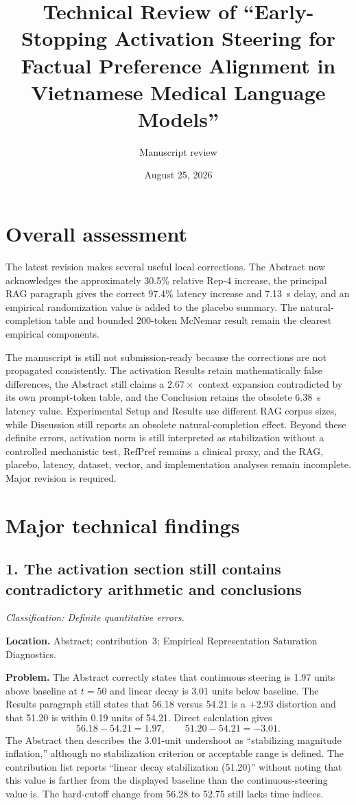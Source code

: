 \documentclass[11pt]{article}
\title{Technical Review of ``Early-Stopping Activation Steering for Factual Preference Alignment in Vietnamese Medical Language Models''}
\author{Manuscript review}
\date{August 25, 2026}
\newcommand{\findinglabel}[1]{\textbf{#1}}
\newcommand{\classification}[1]{\textit{Classification: #1.}}
\begin{document}
\maketitle

\section*{Overall assessment}

The latest revision makes several useful local corrections.  The Abstract now acknowledges the approximately 30.5\% relative Rep-4 increase, the principal RAG paragraph gives the correct 97.4\% latency increase and 7.13~s delay, and an empirical randomization value is added to the placebo summary.  The natural-completion table and bounded 200-token McNemar result remain the clearest empirical components.

The manuscript is still not submission-ready because the corrections are not propagated consistently.  The activation Results retain mathematically false differences, the Abstract still claims a $2.67\times$ context expansion contradicted by its own prompt-token table, and the Conclusion retains the obsolete 6.38~s latency value.  Experimental Setup and Results use different RAG corpus sizes, while Discussion still reports an obsolete natural-completion effect.  Beyond these definite errors, activation norm is still interpreted as stabilization without a controlled mechanistic test, RefPref remains a clinical proxy, and the RAG, placebo, latency, dataset, vector, and implementation analyses remain incomplete.  Major revision is required.

\section*{Major technical findings}

\subsection*{1. The activation section still contains contradictory arithmetic and conclusions}

\classification{Definite quantitative errors}

\findinglabel{Location.} Abstract; contribution~3; Empirical Representation Saturation Diagnostics.

\findinglabel{Problem.} The Abstract correctly states that continuous steering is 1.97 units above baseline at $t=50$ and linear decay is 3.01 units below baseline.  The Results paragraph still states that 56.18 versus 54.21 is a $+2.93$ distortion and that 51.20 is within 0.19 units of 54.21.  Direct calculation gives
\[
56.18-54.21=1.97,
\qquad
51.20-54.21=-3.01.
\]
The Abstract then describes the 3.01-unit undershoot as ``stabilizing magnitude inflation,'' although no stabilization criterion or acceptable range is defined.  The contribution list reports ``linear decay stabilization (51.20)'' without noting that this value is farther from the displayed baseline than the continuous-steering value is.  The hard-cutoff change from 56.28 to 52.75 still lacks time indices.
\end{document}
